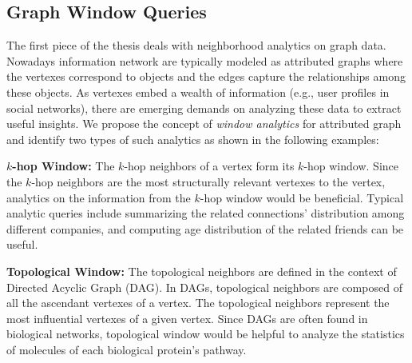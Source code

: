 \subsection{Graph Window Queries}
The first piece of the thesis deals with neighborhood analytics
on graph data. Nowadays information network are typically
modeled as attributed graphs where the 
vertexes correspond to objects and the edges capture the
relationships among these objects. As vertexes embed a wealth
of information (e.g., user profiles in social networks), there are 
emerging demands on analyzing these data to extract useful insights. 
We propose the concept of \emph{window analytics} 
for attributed graph and identify two types of such analytics as shown in the following examples:

\textbf{$k$-hop Window:} The $k$-hop neighbors of a vertex form
its $k$-hop window. Since the $k$-hop neighbors are the most structurally
relevant vertexes to the vertex, analytics on the information from the $k$-hop window
would be beneficial. Typical analytic queries include summarizing the related connections' distribution among different companies, and computing age distribution of the related friends can be useful.

\textbf{Topological Window:} The topological neighbors are defined
in the context of Directed Acyclic Graph (DAG). In DAGs,
topological neighbors are composed of all the ascendant vertexes of a vertex. 
The topological neighbors represent the most influential vertexes of a given vertex.
Since DAGs are often found in biological networks, topological window would
be helpful to analyze the statistics of molecules of each biological protein's pathway.

